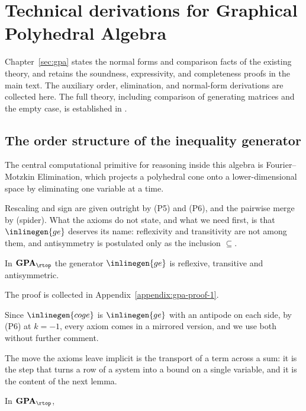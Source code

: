 \chapter{Technical derivations for Graphical Polyhedral Algebra}
\label{appendix:gpa-proofs}

Chapter~\ref{sec:gpa} states the normal forms and comparison facts of the
existing theory, and retains the soundness, expressivity, and completeness
proofs in the main text. The auxiliary order, elimination, and normal-form
derivations are collected here. The full theory, including comparison of
generating matrices and the empty case, is established in
\cite{bonchi2021polyhedral}.

\section{The order structure of the inequality generator}\label{sec:gpa-rules}

The central computational primitive for reasoning inside this algebra is
Fourier--Motzkin Elimination, which projects a polyhedral cone onto a
lower-dimensional space by eliminating one variable at a time.

Rescaling and sign are given outright by (P5) and (P6), and the pairwise merge
by (spider). What the axioms do not state, and what we need first, is that
$\inlinegen{ge}$ deserves its name: reflexivity and transitivity are not among
them, and antisymmetry is postulated only as the inclusion
$\subseteq$.

\begin{lemma}\label{lem:order}
    In $\mathbf{GPA}_{\rtop}$ the generator $\inlinegen{ge}$ is reflexive,
    transitive and antisymmetric.
\end{lemma}

\noindent The proof is collected in Appendix~\ref{appendix:gpa-proof-1}.

Since $\inlinegen{coge}$ is $\inlinegen{ge}$ with an antipode on each side, by
(P6) at $k=-1$, every axiom comes in a mirrored version, and we use both
without further comment.

The move the axioms leave implicit is the transport of a term across a sum: it
is the step that turns a row of a system into a bound on a single variable,
and it is the content of the next lemma.

\begin{lemma}\label{lem:capform}
    In $\mathbf{GPA}_{\rtop}$,
    
\end{lemma}

